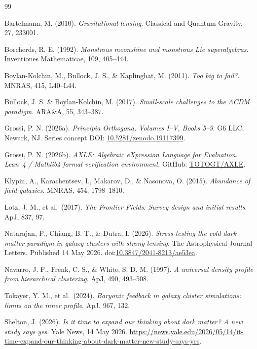 \documentclass[11pt,a4paper]{article}
\theoremstyle{definition}
\theoremstyle{remark}
\begin{document}

\begin{thebibliography}{99}

Bartelmann, M. (2010). \emph{Gravitational lensing}. Classical and Quantum Gravity, 27, 233001.

Borcherds, R. E. (1992). \emph{Monstrous moonshine and monstrous Lie superalgebras}. Inventiones Mathematicae, 109, 405--444.

Boylan-Kolchin, M., Bullock, J. S., \& Kaplinghat, M. (2011). \emph{Too big to fail?}. MNRAS, 415, L40--L44.

Bullock, J. S. \& Boylan-Kolchin, M. (2017). \emph{Small-scale challenges to the $\Lambda$CDM paradigm}. ARA\&A, 55, 343--387.

Grossi, P. N. (2026a). \emph{Principia Orthogona, Volumes I--V, Books 5--9}. G6 LLC, Newark, NJ. Series concept DOI: \href{https://doi.org/10.5281/zenodo.19117399}{10.5281/zenodo.19117399}.

Grossi, P. N. (2026b). \emph{AXLE: Algebraic eXpression Language for Evaluation. Lean~4 / Mathlib4 formal verification environment}. GitHub: \href{https://github.com/TOTOGT/AXLE}{TOTOGT/AXLE}.

Klypin, A., Karachentsev, I., Makarov, D., \& Nasonova, O. (2015). \emph{Abundance of field galaxies}. MNRAS, 454, 1798--1810.

Lotz, J. M., et al.\ (2017). \emph{The Frontier Fields: Survey design and initial results}. ApJ, 837, 97.

Natarajan, P., Chiang, B. T., \& Dutra, I. (2026). \emph{Stress-testing the cold dark matter paradigm in galaxy clusters with strong lensing}. The Astrophysical Journal Letters. Published 14 May 2026. doi:\href{https://doi.org/10.3847/2041-8213/ae53ea}{10.3847/2041-8213/ae53ea}.

Navarro, J. F., Frenk, C. S., \& White, S. D. M. (1997). \emph{A universal density profile from hierarchical clustering}. ApJ, 490, 493--508.

Tokayer, Y. M., et al.\ (2024). \emph{Baryonic feedback in galaxy cluster simulations: limits on the inner profile}. ApJ, 967, 132.

Shelton, J. (2026). \emph{Is it time to expand our thinking about dark matter? A new study says yes}. Yale News, 14 May 2026. \url{https://news.yale.edu/2026/05/14/it-time-expand-our-thinking-about-dark-matter-new-study-says-yes}.

\end{thebibliography}
\end{document}

